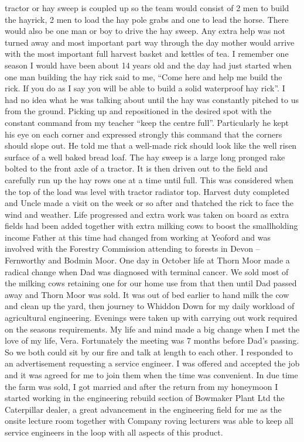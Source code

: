 tractor or hay sweep is coupled up so the team would consist of 2 men to build
the hayrick, 2 men to load the hay pole grabs and one to lead the horse.  There
would also be one man or boy to drive the hay sweep.  Any extra help was not
turned away and most important part way through the day mother would arrive
with the most important full harvest basket and kettles of tea.  I remember one
season I would have been about 14 years old and the day had just started when
one man building the hay rick said to me, ``Come here and help me build the
rick.  If you do as I say you will be able to build a solid waterproof hay
rick''.  I had no idea what he was talking about until the hay was constantly
pitched to us from the ground.  Picking up and repositioned in the desired spot
with the constant command from my teacher ``keep the centre full''.
Particularly he kept his eye on each corner and expressed strongly this command
that the corners should slope out.  He told me that a well-made rick should
look like the well risen surface of a well baked bread loaf.   The hay sweep is
a large long pronged rake bolted to the front axle of a tractor. It is then
driven out to the field and carefully run up the hay rows one at a time until
full.  This was considered when the top of the load was level with tractor
radiator top.  Harvest duty completed and Uncle made a visit on the week or so
after and thatched the rick to face the wind and weather. Life progressed and
extra work was taken on board as extra fields had been added together with
extra milking cows to boost the smallholding income   Father at this time had
changed from working at Yeoford and was involved with the Forestry Commission
attending to forests in Devon – Fernworthy and Bodmin Moor. One day in October
life at Thorn Moor made a radical change when Dad was diagnosed with terminal
cancer.  We sold most of the milking cows retaining one for our home use from
that then until Dad passed away and Thorn Moor was sold. It was out of bed
earlier to hand milk the cow and clean up the yard, then journey to Whiddon
Down for my daily workload of agricultural engineering.  Evenings were taken up
with carrying out work required on the seasons requirements.  My life and mind
made a big change when I met the love of my life, Vera.  Fortunately the
meeting was 7 months before Dad's passing.  So we both could sit by our fire
and talk at length to each other.  I responded to an advertisement requesting a
service engineer.  I was offered and accepted the job and it was agreed for me
to join them when the time was convenient.  In due time the farm was sold, I
got married and after the return from my honeymoon I started working in the
engineering rebuild section of Bowmaker Plant Ltd the Caterpillar dealer, a
great advancement in the engineering field for me as the onsite lecture room
together with Company roving lecturers was able to keep all service engineers
in the loop with all aspects of this product.
